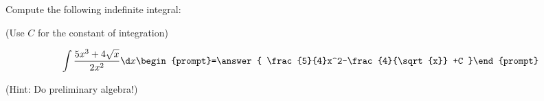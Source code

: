 \documentclass{ximera}
\author{Jim Talamo}
\begin{document}
\begin{exercise}
Compute the following indefinite integral:

\begin{prompt} (Use $C$ for the constant of integration) \end{prompt}

\[
\int \frac{5x^3+4\sqrt{x}}{2x^2}  \d x 
\begin{prompt}=\answer{ \frac{5}{4}x^2-\frac{4}{\sqrt{x}}  +C }\end{prompt}
\]

(Hint: Do preliminary algebra!)
\end{exercise}
\end{document}
